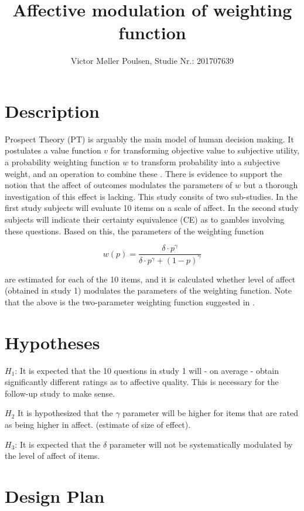 \documentclass[12pt]{article}
\title{Affective modulation of weighting function}
\author{Victor Møller Poulsen, Studie Nr.: 201707639}
\begin{document}
\maketitle
\leavevmode

\section{Description}
Prospect Theory \autocite{kahneman2013prospect,
tversky1992advances} (PT) is arguably the main model
of human decision making. It postulates a value
function $v$ for transforming objective value to
subjective utility, a probability weighting function $w$ to
transform probability into a subjective weight, and
an operation to combine these \autocite{
gonzalez1999shape}. There is evidence to support
the notion that the affect of outcomes modulates
the parameters of $w$ \autocite{
rottenstreich2001money,
hsee2004music} but a thorough investigation
of this effect is lacking. This study consits
of two sub-studies. In the first study subjects
will evaluate 10 items on a scale of affect.
In the second study subjects will indicate their
certainty equivalence (CE) as to gambles
involving these questions. Based on this, the
parameters of the weighting function

\[
	w(p) = \frac{\delta \cdot p^{\gamma}}
	{\delta \cdot p^{\gamma} + (1-p)^{\gamma}}
\]

are estimated for each of the 10 items, and it
is calculated whether level of affect (obtained in
study 1) modulates the parameters of the weighting
function. Note that the above is the two-parameter
weighting function
suggested in \autocite{gonzalez1999shape}.

\section{Hypotheses}

$H_1$: It is expected that the 10 questions in
study 1 will - on average - obtain significantly
different ratings as to affective quality.
This is necessary for the follow-up study to
make sense.

$H_2$ It is hypothesized that the $\gamma$
parameter will be higher for items that are
rated as being higher in affect.
(estimate of size of effect).

$H_3$: It is expected that the $\delta$
parameter will not be systematically
modulated by the level of affect of items.

\section{Design Plan}
\end{document}
